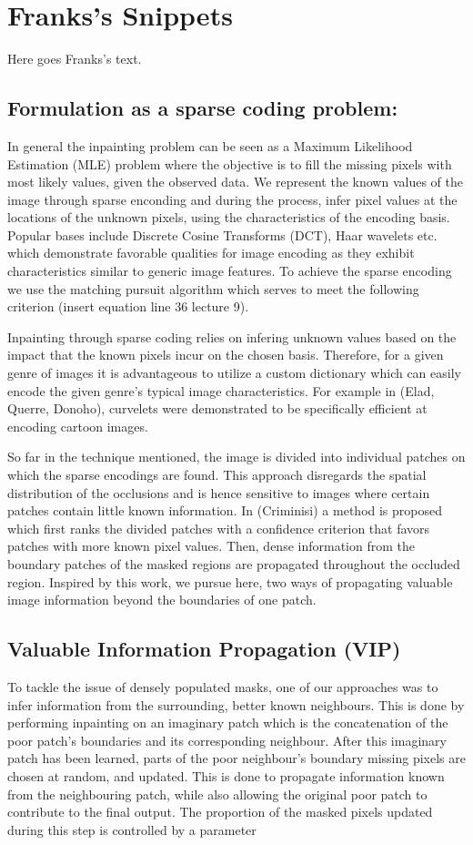 \section*{Franks's Snippets}
Here goes Franks's text.

\subsection{Formulation as a sparse coding problem:}

In general the inpainting problem can be seen as a Maximum Likelihood Estimation (MLE) problem where the objective is to fill the missing pixels with most likely values, given the observed data. We represent the known values of the image through sparse enconding and during the process, infer pixel values at the locations of the unknown pixels, using the characteristics of the encoding basis. Popular bases include Discrete Cosine Transforms (DCT), Haar wavelets etc. which demonstrate favorable qualities for image encoding as they exhibit characteristics similar to generic image features. To achieve the sparse encoding we use the matching pursuit algorithm which serves to meet the following criterion (insert equation line 36 lecture 9).

Inpainting through sparse coding relies on infering unknown values based on the impact that the known pixels incur on the chosen basis. Therefore, for a given genre of images it is advantageous to utilize a custom dictionary which can easily encode the given genre's typical image characteristics. For example  in (Elad, Querre, Donoho), curvelets were demonstrated to be specifically efficient at encoding cartoon images. 

So far in the technique mentioned, the image is divided into individual patches on which the sparse encodings are found. This approach disregards the spatial distribution of the occlusions and is hence sensitive to images where certain patches contain little known information. In (Criminisi) a method is proposed which first ranks the divided patches with a confidence criterion that favors patches with more known pixel values. Then, dense information from the boundary patches of the masked regions are propagated throughout the occluded region. Inspired by this work, we pursue here, two ways of propagating valuable image information beyond the boundaries of one patch.

\subsection{Valuable Information Propagation (VIP)}
To tackle the issue of densely populated masks, one of our approaches was to infer information from the surrounding, better known neighbours. This is done by performing inpainting on an imaginary patch which is the concatenation of the poor patch's boundaries and its corresponding neighbour. After this imaginary patch has been learned, parts of the poor neighbour's boundary missing pixels are chosen at random, and updated. This is done to propagate information known from the neighbouring patch, while also allowing the original poor patch to contribute to the final output. The proportion of the masked pixels updated during this step is controlled by a parameter \epsilon 
